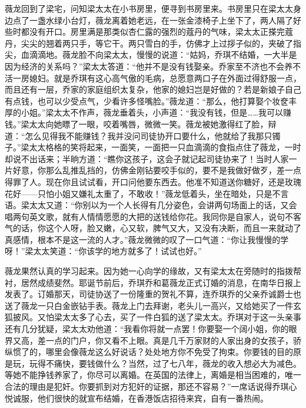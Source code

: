 \par 薇龙回到了梁宅，问知梁太太在小书房里，便寻到书房里来。书房里只在梁太太身边点了一盏水绿小台灯，薇龙离着她老远，在一张金漆椅子上坐下了，两人隔了好些时都没有开口。房里满是那类似杏仁露的强烈的蔻丹的气味，梁太太正搽完蔻丹，尖尖的翘着两只手，等它干。两只雪白的手，仿佛才上过拶子似的，夹破了指尖，血滴滴地。薇龙脸不向梁太太，慢慢的说道：“姑妈，乔琪不结婚，一大半是因为经济的关系吗？”梁太太答道：“他并不是没有钱娶亲。乔家至不济也不会养不活一房媳妇。就是乔琪有这心高气傲的毛病，总愿意两口子在外面过得舒服一点，而且还有一层，乔家的家庭组织太复杂，他家的媳妇岂是好做的？若是新娘子自己有点钱，也可以少受点气，少看许多怪嘴脸。”薇龙道：“那么，他打算娶个妆奁丰厚的小姐。”梁太太不作声，薇龙垂着头，小声道：“我没有钱，但是……我可以赚钱。”梁太太向她瞟了一眼，咬着嘴唇，微微一笑。薇龙被她激得红了脸，辩道：“怎么见得我不能赚钱？我并没问司徒协开口要什么，他就给了我那只镯子。”梁太太格格的笑将起来，一面笑，一面把一只血滴滴的食指点住了薇龙，一时却说不出话来；半晌方道：“瞧你这孩子，这会子就记起司徒协来了！当时人家一片好意，你那么乱推乱挡的，仿佛金刚钻要咬手似的，要不是我做好做歹，差一点得罪了人。现在你且试试看，开口问他要东西去。他准不知道送你糖好，还是玫瑰花好——只怕小姐又嫌礼太重了，不敢收！”薇龙低着头，坐在暗处，只是不言语。梁太太又道：“你别以为一个人长得有几分姿色，会讲两句场面上的话，又会唱两句英文歌，就有人情情愿愿的大把的送钱给你花。我同你是自家人，说句不客气的话，你这个人呀，脸又嫩，心又软，脾气又大，又没有决断，而且一来就动了真感情，根本不是这一流的人才。”薇龙微微的叹了一口气道：“你让我慢慢的学呀！”梁太太笑道：“你该学的地方就多了！试试也好。”
\par 薇龙果然认真的学习起来。因为她一心向学的缘故，又有梁太太在旁随时的指拨帮衬，居然成绩斐然。耶诞节前后，乔琪乔和葛薇龙正式订婚的消息，在南华日报上发表了。订婚那天，司徒协送了一份隆重的贺礼不算，连乔琪乔的父亲乔诚爵士也送了薇龙一只白金嵌钻手表。薇龙上门去拜谢，老头儿一高兴，又给她买了一件玄狐披风。又怕梁太太多了心去，买了一件白狐的送了梁太太。乔琪对于这一头亲事还有几分犹疑，梁太太劝他道：“我看你将就一点罢！你要娶一个阔小姐，你的眼界又高，差一点的门户，你又看不上眼。真是几千万家财的人家出身的女孩子，骄纵惯了的，哪里会像薇龙这么好说话？处处地方你不免受了拘束。你要钱的目的原是玩，玩得不痛快，要钱做什么？当然，过了七八年，薇龙的收入想必大为减色。等她不能挣钱养家了，你尽可以离婚。在英国的法律上，离婚是相当困难的，唯一合法的理由是犯奸。你要抓到对方犯奸的证据，那还不容易？”一席话说得乔琪心悦诚服，他们很快的就宣布结婚，在香港饭店招待来宾，自有一番热闹。
